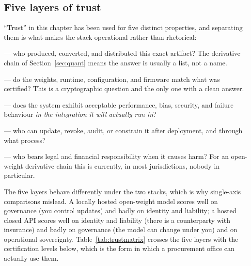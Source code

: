 \subsection{Five layers of trust}
\label{sec:trustlayers}

``Trust'' in this chapter has been used for five distinct properties, and separating them is what makes the stack operational rather than rhetorical:

\begin{description}\itemsep2pt
  \item[Identity] --- who produced, converted, and distributed this exact artifact? The derivative chain of Section~\ref{sec:quant} means the answer is usually a list, not a name.
  \item[Integrity] --- do the weights, runtime, configuration, and firmware match what was certified? This is a cryptographic question and the only one with a clean answer.
  \item[Behaviour] --- does the system exhibit acceptable performance, bias, security, and failure behaviour \emph{in the integration it will actually run in}?
  \item[Governance] --- who can update, revoke, audit, or constrain it after deployment, and through what process?
  \item[Liability] --- who bears legal and financial responsibility when it causes harm? For an open-weight derivative chain this is currently, in most jurisdictions, nobody in particular.
\end{description}

The five layers behave differently under the two stacks, which is why single-axis comparisons mislead. A locally hosted open-weight model scores well on governance (you control updates) and badly on identity and liability; a hosted closed API scores well on identity and liability (there is a counterparty with insurance) and badly on governance (the model can change under you) and on operational sovereignty. Table~\ref{tab:trustmatrix} crosses the five layers with the certification levels below, which is the form in which a procurement office can actually use them.

